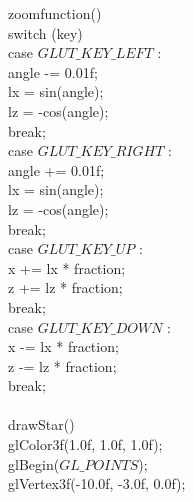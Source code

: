 \documentclass[letterpaper, 10 pt, conference]{ieeeconf}  %
\begin{document}
	\hspace*{5mm} zoomfunction()\\
\hspace*{10mm}		switch (key) \\
\hspace*{15mm}			case $GLUT\_KEY\_LEFT$ :\\
\hspace*{20mm}				angle -= 0.01f;\\
\hspace*{20mm}				lx = sin(angle);\\
\hspace*{20mm}				lz = -cos(angle);\\
	\hspace*{15mm}			break;\\
\hspace*{15mm}			case $GLUT\_KEY\_RIGHT$ : \\
\hspace*{20mm}				angle += 0.01f; \\
\hspace*{20mm}				lx = sin(angle); \\
\hspace*{20mm}				lz = -cos(angle); \\
\hspace*{15mm}				break;\\
\hspace*{15mm}			case $GLUT\_KEY\_UP$ :\\
\hspace*{20mm}				x += lx * fraction;\\
\hspace*{20mm}				z += lz * fraction;\\
\hspace*{15mm}				break;\\
\hspace*{15mm}			case $GLUT\_KEY\_DOWN$ :\\
\hspace*{20mm}				x -= lx * fraction;\\
\hspace*{20mm}				z -= lz * 	fraction;\\
\hspace*{15mm}				break; \\ \\ 

\hspace*{5mm}	drawStar() \\
  \hspace*{10mm}  glColor3f(1.0f, 1.0f, 1.0f);\\
   \hspace*{10mm} 		glBegin($GL\_POINTS$);\\
\hspace*{10mm}		glVertex3f(-10.0f, -3.0f, 0.0f); \\ \\
\end{document}

